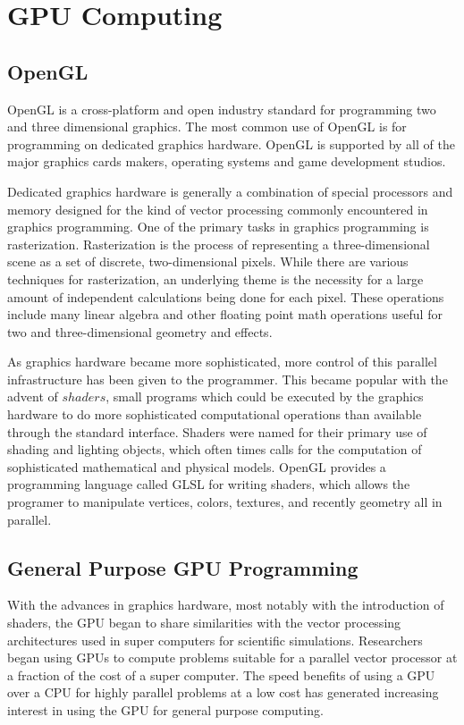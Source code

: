 \chapter{GPU Computing}

\section{OpenGL}
OpenGL is a cross-platform and open industry standard for programming two and
three dimensional graphics.\cite{OpenGL} The most common use of OpenGL is for programming on
dedicated graphics hardware. OpenGL is supported by all of the major graphics
cards makers, operating systems and game development studios.


Dedicated graphics hardware is generally a combination of special processors
and memory designed for the kind of vector processing commonly encountered in
graphics programming. One of the primary tasks in graphics programming is
rasterization. Rasterization is the process of representing a three-dimensional
scene as a set of discrete, two-dimensional pixels. While there are various
techniques for rasterization, an underlying theme is the necessity for a large
amount of independent calculations being done for each pixel. These operations
include many linear algebra and other floating point math operations useful for
two and three-dimensional geometry and effects.


As graphics hardware became more sophisticated, more control of this parallel
infrastructure has been given to the programmer. This became popular with the
advent of $shaders$, small programs which could be executed by the graphics
hardware to do more sophisticated computational operations than available
through the standard interface. Shaders were named for their primary use of
shading and lighting objects, which often times calls for the computation of
sophisticated mathematical and physical models. OpenGL provides a programming
language called GLSL for writing shaders, which allows the programer to
manipulate vertices, colors, textures, and recently geometry all in parallel.


\section{General Purpose GPU Programming}

With the advances in graphics hardware, most notably with the introduction of
shaders, the GPU began to share similarities with the vector processing
architectures used in super computers for scientific simulations. Researchers
began using GPUs to compute problems suitable for a parallel vector processor
at a fraction of the cost of a super computer. The speed benefits of using a
GPU over a CPU for highly parallel problems at a low cost has generated
increasing interest in using the GPU for general purpose computing.

